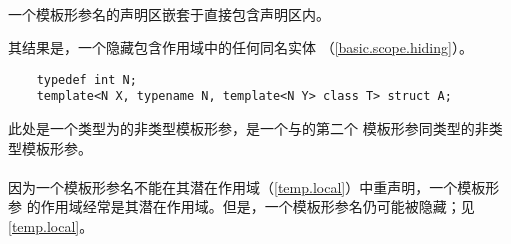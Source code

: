 \paragraph{} %
一个模板形参名的声明区嵌套于直接包含声明区内。

\begin{note} %
  其结果是，一个隐藏包含作用域中的任何同名实体
  （\ref{basic.scope.hiding}）。

  \begin{example} %
    \begin{lstlisting}
    typedef int N;
    template<N X, typename N, template<N Y> class T> struct A;
    \end{lstlisting}
    此处是一个类型为的非类型模板形参，是一个与的第二个
    模板形参同类型的非类型模板形参。
  \end{example}

\end{note}

\paragraph{} %
\begin{note} %
  因为一个模板形参名不能在其潜在作用域（\ref{temp.local}）中重声明，一个模板形参
  的作用域经常是其潜在作用域。但是，一个模板形参名仍可能被隐藏；见
  \ref{temp.local}。
\end{note}
